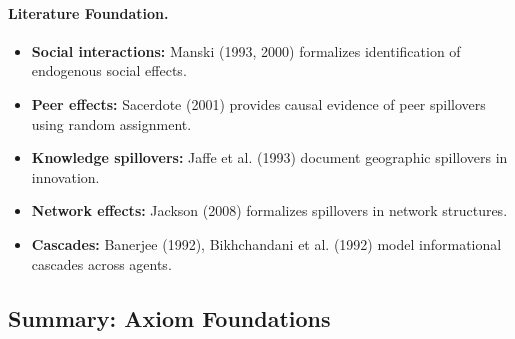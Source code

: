 \paragraph{Literature Foundation.}
\begin{itemize}
\item \textbf{Social interactions:} Manski (1993, 2000) formalizes identification 
of endogenous social effects.
\item \textbf{Peer effects:} Sacerdote (2001) provides causal evidence of 
peer spillovers using random assignment.
\item \textbf{Knowledge spillovers:} Jaffe et al. (1993) document geographic 
spillovers in innovation.
\item \textbf{Network effects:} Jackson (2008) formalizes spillovers in 
network structures.
\item \textbf{Cascades:} Banerjee (1992), Bikhchandani et al. (1992) model 
informational cascades across agents.
\end{itemize}

\subsection{Summary: Axiom Foundations}

